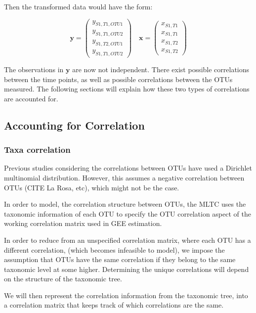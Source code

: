 \documentclass[12pt]{article}
\begin{document}
Then the transformed data would have the form:

$$
\mathbf{y} = \begin{pmatrix}
    y_{S1,T1,OTU1}\\
    y_{S1,T1,OTU2}\\
    y_ {S1,T2,OTU1}\\
    y_{S1,T1,OTU2}
\end{pmatrix} \quad
\mathbf{x} = \begin{pmatrix}
      x_{S1,T1}\\
      x_{S1,T1}\\
      x_{S1,T2}\\
      x_{S1,T2}
\end{pmatrix}$$

The observations in $\mathbf{y}$ are now not independent. There exist possible correlations between the time points, as well as possible correlations between the OTUs measured. The following sections will explain how these two types of correlations are accounted for.

\subsection{Accounting for Correlation}
\subsubsection{Taxa correlation}

Previous studies considering the correlations between OTUs have used a Dirichlet multinomial distribution. However, this assumes a negative correlation between OTUs (CITE La Rosa, etc), which might not be the case.

In order to model, the correlation structure between OTUs, the MLTC uses the taxonomic information of each OTU to specify the OTU correlation aspect of the working correlation matrix used in GEE estimation.


In order to reduce from an unspecified correlation matrix, where each OTU has a different correlation, (which becomes infeasible to model), we impose the assumption that OTUs have the same correlation if they belong to the same taxonomic level at some higher. Determining the unique correlations will depend on the structure of the taxonomic tree.

We will then represent the correlation information from the taxonomic tree, into a correlation matrix that keeps track of which correlations are the same.
\end{document}
